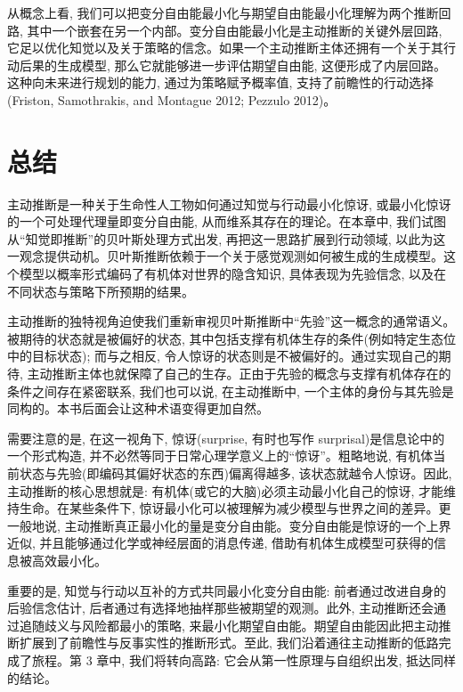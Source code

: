 从概念上看, 我们可以把变分自由能最小化与期望自由能最小化理解为两个推断回路, 其中一个嵌套在另一个内部。变分自由能最小化是主动推断的关键外层回路, 它足以优化知觉以及关于策略的信念。如果一个主动推断主体还拥有一个关于其行动后果的生成模型, 那么它就能够进一步评估期望自由能, 这便形成了内层回路。这种向未来进行规划的能力, 通过为策略赋予概率值, 支持了前瞻性的行动选择(Friston, Samothrakis, and Montague 2012; Pezzulo 2012)。

\section{总结}

主动推断是一种关于生命性人工物如何通过知觉与行动最小化惊讶, 或最小化惊讶的一个可处理代理量即变分自由能, 从而维系其存在的理论。在本章中, 我们试图从``知觉即推断''的贝叶斯处理方式出发, 再把这一思路扩展到行动领域, 以此为这一观念提供动机。贝叶斯推断依赖于一个关于感觉观测如何被生成的生成模型。这个模型以概率形式编码了有机体对世界的隐含知识, 具体表现为先验信念, 以及在不同状态与策略下所预期的结果。

主动推断的独特视角迫使我们重新审视贝叶斯推断中``先验''这一概念的通常语义。被期待的状态就是被偏好的状态, 其中包括支撑有机体生存的条件(例如特定生态位中的目标状态); 而与之相反, 令人惊讶的状态则是不被偏好的。通过实现自己的期待, 主动推断主体也就保障了自己的生存。正由于先验的概念与支撑有机体存在的条件之间存在紧密联系, 我们也可以说, 在主动推断中, 一个主体的身份与其先验是同构的。本书后面会让这种术语变得更加自然。

需要注意的是, 在这一视角下, 惊讶(surprise, 有时也写作 surprisal)是信息论中的一个形式构造, 并不必然等同于日常心理学意义上的``惊讶''。粗略地说, 有机体当前状态与先验(即编码其偏好状态的东西)偏离得越多, 该状态就越令人惊讶。因此, 主动推断的核心思想就是: 有机体(或它的大脑)必须主动最小化自己的惊讶, 才能维持生命。在某些条件下, 惊讶最小化可以被理解为减少模型与世界之间的差异。更一般地说, 主动推断真正最小化的量是变分自由能。变分自由能是惊讶的一个上界近似, 并且能够通过化学或神经层面的消息传递, 借助有机体生成模型可获得的信息被高效最小化。

重要的是, 知觉与行动以互补的方式共同最小化变分自由能: 前者通过改进自身的后验信念估计, 后者通过有选择地抽样那些被期望的观测。此外, 主动推断还会通过追随歧义与风险都最小的策略, 来最小化期望自由能。期望自由能因此把主动推断扩展到了前瞻性与反事实性的推断形式。至此, 我们沿着通往主动推断的低路完成了旅程。第 3 章中, 我们将转向高路: 它会从第一性原理与自组织出发, 抵达同样的结论。

